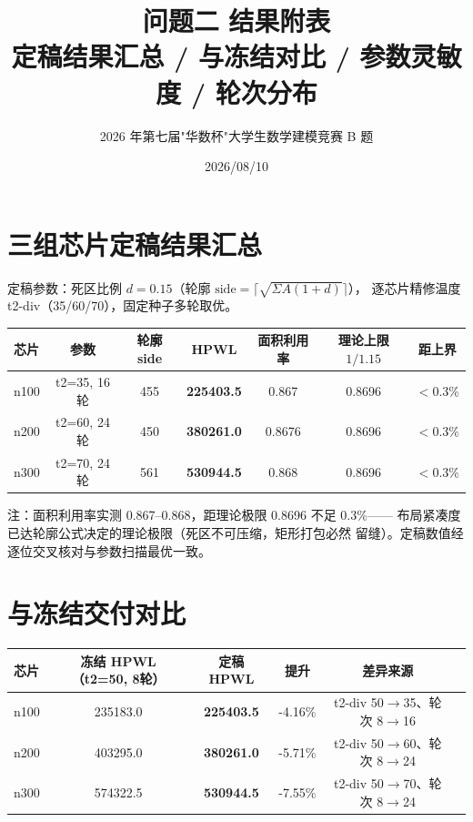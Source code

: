 \documentclass[12pt,a4paper]{article}
\title{\textbf{问题二 结果附表}\\[6pt]
\large 定稿结果汇总 / 与冻结对比 / 参数灵敏度 / 轮次分布}
\author{2026 年第七届"华数杯"大学生数学建模竞赛 B 题}
\date{2026/08/10}
\begin{document}
\maketitle

\section{三组芯片定稿结果汇总}

定稿参数：死区比例 $d=0.15$（轮廓 $\text{side}=\lceil\sqrt{\Sigma A(1+d)}\rceil$），
逐芯片精修温度 t2-div（35/60/70），固定种子多轮取优。

\begin{table}[H]
\centering
\scriptsize
\setlength{\tabcolsep}{3pt}
\begin{tabular}{lcccccc}
\toprule
芯片 & 参数 & 轮廓 side & HPWL & 面积利用率 & 理论上限 $1/1.15$ & 距上界 \\
\midrule

n100 & t2=35, 16轮 & 455 & \textbf{225403.5} & 0.867 & 0.8696 & $<0.3\%$ \\
n200 & t2=60, 24轮 & 450 & \textbf{380261.0} & 0.8676 & 0.8696 & $<0.3\%$ \\
n300 & t2=70, 24轮 & 561 & \textbf{530944.5} & 0.868 & 0.8696 & $<0.3\%$ \\
\bottomrule
\end{tabular}
\end{table}

注：面积利用率实测 0.867--0.868，距理论极限 0.8696 不足 0.3\%——
布局紧凑度已达轮廓公式决定的理论极限（死区不可压缩，矩形打包必然
留缝）。定稿数值经逐位交叉核对与参数扫描最优一致。

\section{与冻结交付对比}

\begin{table}[H]
\centering
\scriptsize
\setlength{\tabcolsep}{3pt}
\begin{tabular}{lccccc}
\toprule
芯片 & 冻结 HPWL（t2=50, 8轮） & 定稿 HPWL & 提升 & 差异来源 \\
\midrule

n100 & 235183.0 & \textbf{225403.5} & -4.16\% & t2-div 50$\to$35、轮次 8$\to$16 \\
n200 & 403295.0 & \textbf{380261.0} & -5.71\% & t2-div 50$\to$60、轮次 8$\to$24 \\
n300 & 574322.5 & \textbf{530944.5} & -7.55\% & t2-div 50$\to$70、轮次 8$\to$24 \\
\bottomrule
\end{tabular}
\end{table}
\end{document}
